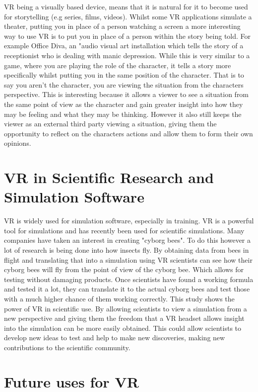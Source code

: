 \documentclass{scrartcl}
\begin{document}
VR being a visually based device, means that it is natural for it to become used for storytelling (e.g series, films, videos). Whilst some VR applications simulate a theater, putting you in place of a person watching a screen a more interesting way to use VR is to put you in place of a person within the story being told. For example Office Diva\cite{Diva}, an "audio visual art installation which tells the story of a receptionist who is dealing with manic depression.  
While this is very similar to a game, where you are playing the role of the character, it tells a story more specifically whilst putting you in the same position of the character. That is to say you aren’t the character, you are viewing the situation from the characters perspective. 
This is interesting because it allows a viewer to see a situation from the same point of view as the character and gain greater insight into how they may be feeling and what they may be thinking. However it also still keeps the viewer as an external third party viewing a situation, giving them the opportunity to reflect on the characters actions and allow them to form their own opinions. 

\section{VR in Scientific Research and Simulation Software}

VR is widely used for simulation software, especially in training. VR is a powerful tool for simulations and has recently been used for scientific simulations. Many companies have taken an interest in creating "cyborg bees". To do this however a lot of research is being done into how insects fly. By obtaining data from bees in flight and translating that into a simulation using VR scientists can see how their cyborg bees will fly from the point of view of the cyborg bee\cite{zheng2017real}. Which allows for testing without damaging products. Once scientists have found a working formula and tested it a lot, they can translate it to the actual cyborg bees and test those with a much higher chance of them working correctly. 
This study shows the power of VR in scientific use. By allowing scientists to view a simulation from a new perspective and giving them the freedom that a VR headset allows insight into the simulation can be more easily obtained. This could allow scientists to develop new ideas to test and help to make new discoveries, making new contributions to the scientific community. 

\section{Future uses for VR}
 
\end{document}
